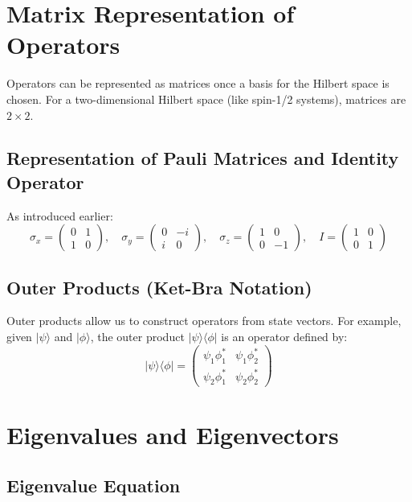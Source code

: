\documentclass[12pt]{article}
\begin{document}
\section{Matrix Representation of Operators}

Operators can be represented as matrices once a basis for the Hilbert space is chosen. For a two-dimensional Hilbert space (like spin-1/2 systems), matrices are \( 2 \times 2 \).

\subsection{Representation of Pauli Matrices and Identity Operator}

As introduced earlier:
\[
\sigma_x = \begin{pmatrix} 0 & 1 \\ 1 & 0 \end{pmatrix}, \quad \sigma_y = \begin{pmatrix} 0 & -i \\ i & 0 \end{pmatrix}, \quad \sigma_z = \begin{pmatrix} 1 & 0 \\ 0 & -1 \end{pmatrix}, \quad I = \begin{pmatrix} 1 & 0 \\ 0 & 1 \end{pmatrix}
\]

\subsection{Outer Products (Ket-Bra Notation)}

Outer products allow us to construct operators from state vectors. For example, given \( |\psi\rangle \) and \( |\phi\rangle \), the outer product \( |\psi\rangle\langle\phi| \) is an operator defined by:
\[
|\psi\rangle\langle\phi| = \begin{pmatrix} \psi_1 \phi_1^* & \psi_1 \phi_2^* \\ \psi_2 \phi_1^* & \psi_2 \phi_2^* \end{pmatrix}
\]

\section{Eigenvalues and Eigenvectors}

\subsection{Eigenvalue Equation}
\end{document}
